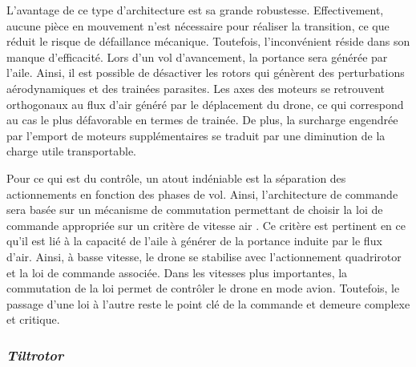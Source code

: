         L'avantage de ce type d'architecture est sa grande robustesse. Effectivement, aucune pièce en mouvement n'est nécessaire pour réaliser la transition, ce que réduit le risque de défaillance mécanique. Toutefois, l'inconvénient réside dans son manque d'efficacité. Lors d'un vol d'avancement, la portance sera générée par l'aile. Ainsi, il est possible de désactiver les rotors qui génèrent des perturbations aérodynamiques et des trainées parasites. Les axes des moteurs se retrouvent orthogonaux au flux d'air généré par le déplacement du drone, ce qui correspond au cas le plus défavorable en termes de trainée. De plus, la surcharge engendrée par l'emport de moteurs supplémentaires se traduit par une diminution de la charge utile transportable. 

        Pour ce qui est du contrôle, un atout indéniable est la séparation des actionnements en fonction des phases de vol. Ainsi, l'architecture de commande sera basée sur un mécanisme de commutation permettant de choisir la loi de commande appropriée sur un critère de vitesse air \cite{LiSongZhang2021, MathurAtkins2021, okulski2022small}. Ce critère est pertinent en ce qu'il est lié à la capacité de l'aile à générer de la portance induite par le flux d'air. Ainsi, à basse vitesse, le drone se stabilise avec l'actionnement quadrirotor et la loi de commande associée. Dans les vitesses plus importantes, la commutation de la loi permet de contrôler le drone en mode avion. Toutefois, le passage d'une loi à l'autre reste le point clé de la commande et demeure complexe et critique.

        \subsubsection*{\textit{Tiltrotor}}

